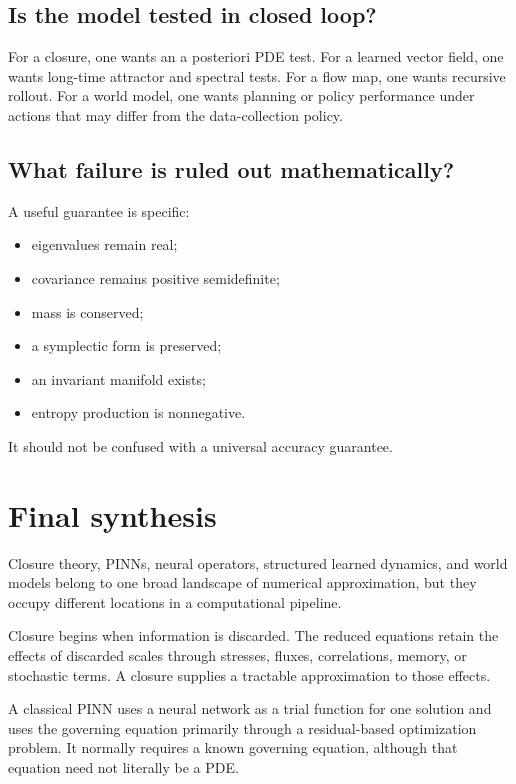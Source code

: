 \documentclass[11pt]{article}
\begin{document}
\subsection{Is the model tested in closed loop?}

For a closure, one wants an a posteriori PDE test. For a learned vector field, one wants long-time attractor and spectral tests. For a flow map, one wants recursive rollout. For a world model, one wants planning or policy performance under actions that may differ from the data-collection policy.

\subsection{What failure is ruled out mathematically?}

A useful guarantee is specific:
\begin{itemize}
  \item eigenvalues remain real;
  \item covariance remains positive semidefinite;
  \item mass is conserved;
  \item a symplectic form is preserved;
  \item an invariant manifold exists;
  \item entropy production is nonnegative.
\end{itemize}
It should not be confused with a universal accuracy guarantee.

\section{Final synthesis}

Closure theory, PINNs, neural operators, structured learned dynamics, and world models belong to one broad landscape of numerical approximation, but they occupy different locations in a computational pipeline.

\begin{takeaway}
Closure begins when information is discarded. The reduced equations retain the effects of discarded scales through stresses, fluxes, correlations, memory, or stochastic terms. A closure supplies a tractable approximation to those effects.
\end{takeaway}

\begin{takeaway}[PINNs]
A classical PINN uses a neural network as a trial function for one solution and uses the governing equation primarily through a residual-based optimization problem. It normally requires a known governing equation, although that equation need not literally be a PDE.
\end{takeaway}
\end{document}
